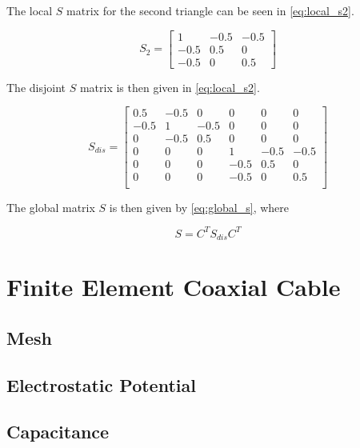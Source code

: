 \documentclass[a4paper,titlepage]{article}
\begin{document}
	The local $S$ matrix for the second triangle can be seen in \cref{eq:local_s2}.
	
	\begin{equation} \label{eq:local_s2}
		S_2 =
			\begin{bmatrix}
				1    & -0.5 & -0.5 \\
				-0.5 & 0.5  & 0 \\
				-0.5 & 0    & 0.5 
			\end{bmatrix}
	\end{equation}
	
	The disjoint $S$ matrix is then given in \cref{eq:local_s2}.
	
	
	\begin{equation} \label{eq:disjoint_s}
		S_{dis} =
		\begin{bmatrix}
		0.5  & -0.5  & 0     & 0     &  0    & 0     \\
		-0.5 & 1     & -0.5  & 0     &  0    & 0     \\
		0    & -0.5  & 0.5   & 0     &  0    & 0     \\
		0    & 0     & 0     & 1     & -0.5  & -0.5 \\
		0    & 0     & 0     & -0.5  & 0.5   & 0 \\
		0    & 0     & 0     & -0.5  & 0     & 0.5 \\
		\end{bmatrix}
	\end{equation}
	
	The global matrix $S$ is then given by \cref{eq:global_s}, where 
	
	\begin{equation} \label{eq:global_s}
		S = C^T S_{dis} C^T
	\end{equation}
	
	\section{Finite Element Coaxial Cable}
	
	\subsection{Mesh}
	
	\subsection{Electrostatic Potential}
	
	\subsection{Capacitance}
	
\end{document}
